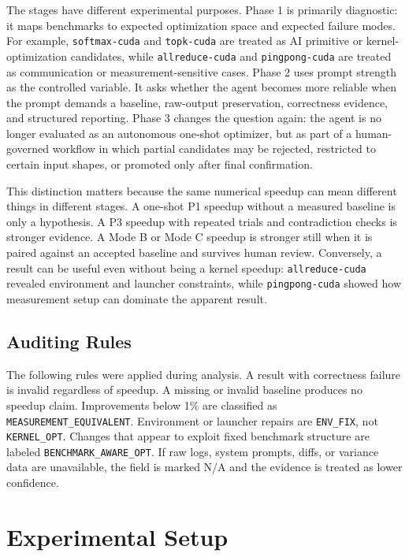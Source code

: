 \documentclass[conference]{IEEEtran}
\begin{document}
The stages have different experimental purposes. Phase 1 is primarily diagnostic: it maps benchmarks to expected optimization space and expected failure modes. For example, \texttt{softmax-cuda} and \texttt{topk-cuda} are treated as AI primitive or kernel-optimization candidates, while \texttt{allreduce-cuda} and \texttt{pingpong-cuda} are treated as communication or measurement-sensitive cases. Phase 2 uses prompt strength as the controlled variable. It asks whether the agent becomes more reliable when the prompt demands a baseline, raw-output preservation, correctness evidence, and structured reporting. Phase 3 changes the question again: the agent is no longer evaluated as an autonomous one-shot optimizer, but as part of a human-governed workflow in which partial candidates may be rejected, restricted to certain input shapes, or promoted only after final confirmation.

This distinction matters because the same numerical speedup can mean different things in different stages. A one-shot P1 speedup without a measured baseline is only a hypothesis. A P3 speedup with repeated trials and contradiction checks is stronger evidence. A Mode B or Mode C speedup is stronger still when it is paired against an accepted baseline and survives human review. Conversely, a result can be useful even without being a kernel speedup: \texttt{allreduce-cuda} revealed environment and launcher constraints, while \texttt{pingpong-cuda} showed how measurement setup can dominate the apparent result.

\subsection{Auditing Rules}

The following rules were applied during analysis. A result with correctness failure is invalid regardless of speedup. A missing or invalid baseline produces no speedup claim. Improvements below 1\% are classified as \texttt{MEASUREMENT\_EQUIVALENT}. Environment or launcher repairs are \texttt{ENV\_FIX}, not \texttt{KERNEL\_OPT}. Changes that appear to exploit fixed benchmark structure are labeled \texttt{BENCHMARK\_AWARE\_OPT}. If raw logs, system prompts, diffs, or variance data are unavailable, the field is marked N/A and the evidence is treated as lower confidence.

\section{Experimental Setup}
\label{sec:setup}
\end{document}

